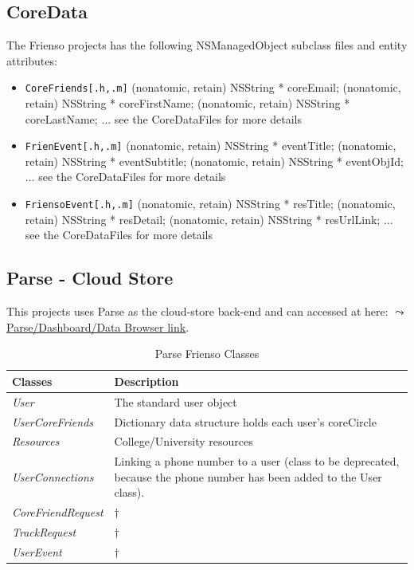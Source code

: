 \subsection{CoreData}
The Frienso projects has the following NSManagedObject subclass files and entity 
attributes:
\begin{itemize}
\item \texttt{CoreFriends[.h,.m]}
	\subitem \small{\@property (nonatomic, retain) NSString * coreEmail;}
	\subitem \small{\@property (nonatomic, retain) NSString * coreFirstName;}
	\subitem \small{\@property (nonatomic, retain) NSString * coreLastName;}
	\subitem \small{$\ldots$ see the CoreDataFiles for more details}
\item \texttt{FrienEvent[.h,.m]}
	\subitem \small{\@property (nonatomic, retain) NSString * eventTitle;}
	\subitem \small{\@property (nonatomic, retain) NSString * eventSubtitle;}
	\subitem \small{\@property (nonatomic, retain) NSString * eventObjId;}
	\subitem \small{$\ldots$ see the CoreDataFiles for more details}
\item \texttt{FriensoEvent[.h,.m]}
	\subitem \small{\@property (nonatomic, retain) NSString * resTitle;}
	\subitem \small{\@property (nonatomic, retain) NSString * resDetail;}
	\subitem \small{\@property (nonatomic, retain) NSString * resUrlLink;}
	\subitem \small{$\ldots$ see the CoreDataFiles for more details}\normalsize
\end{itemize}

\subsection{Parse - Cloud Store}
This projects uses Parse as the cloud-store back-end and can accessed at here: 
\href{https://www.parse.com/apps/frienso--2/collections}{$\leadsto$ Parse/Dashboard/Data Browser 
link}.

\begin{table}[ht!]%
	\caption{Parse Frienso Classes \label{tab:table_label}}
	\begin{tabularx}{\linewidth}{ l X }
	\textbf{Classes} & \textbf{Description} \\\hline
	\emph{User}  & The standard user object \\
	\emph{UserCoreFriends}  & Dictionary data structure holds each user's coreCircle \\
	\emph{Resources}        & College/University resources \\
	\emph{UserConnections}	& Linking a phone number to a user (class to be deprecated,
	because the phone number has been added to the User class).\\
	\emph{CoreFriendRequest}& $\dagger$\\
	\emph{TrackRequest} 	& $\dagger$\\
	\emph{UserEvent} 		& $\dagger$\\
	\end{tabularx}\end{table}%


